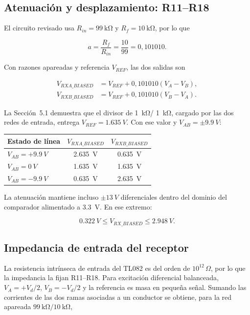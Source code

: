 \documentclass[11pt,a4paper]{article}
\begin{document}
\subsection{Atenuación y desplazamiento: R11--R18}

El circuito revisado usa $R_{in}=\SI{99}{\kilo\ohm}$ y
$R_f=\SI{10}{\kilo\ohm}$, por lo que

\[
 a=\frac{R_f}{R_{in}}=\frac{10}{99}=0{,}101010.
\]

Con razones apareadas y referencia $V_{REF}$, las dos salidas son

\begin{align*}
 V_{RXA\_BIASED} &= V_{REF}+0{,}101010(V_A-V_B),\\
 V_{RXB\_BIASED} &= V_{REF}+0{,}101010(V_B-V_A).
\end{align*}

La Sección~5.1 demuestra que el divisor de \SI{1}{\kilo\ohm}/
\SI{1}{\kilo\ohm}, cargado por las dos redes de entrada, entrega
$V_{REF}=\SI{1.635}{V}$. Con ese valor y $V_{AB}=\pm\SI{9.9}{V}$:

\begin{center}
\begin{tabular}{@{}lcc@{}}
\toprule
Estado de línea & $V_{RXA\_BIASED}$ & $V_{RXB\_BIASED}$ \\
\midrule
$V_{AB}=+\SI{9.9}{V}$ & \SI{2.635}{V} & \SI{0.635}{V} \\
$V_{AB}=\SI{0}{V}$ & \SI{1.635}{V} & \SI{1.635}{V} \\
$V_{AB}=-\SI{9.9}{V}$ & \SI{0.635}{V} & \SI{2.635}{V} \\
\bottomrule
\end{tabular}
\end{center}

La atenuación mantiene incluso $\pm\SI{13}{V}$ diferenciales dentro del
dominio del comparador alimentado a \SI{3.3}{V}. En ese extremo:

\[
 \SI{0.322}{V}\leq V_{RX\_BIASED}\leq\SI{2.948}{V}.
\]

\subsection{Impedancia de entrada del receptor}

La resistencia intrínseca de entrada del TL082 es del orden de
$10^{12}\,\Omega$, por lo que la impedancia la fijan R11--R18. Para excitación
diferencial balanceada, $V_A=+V_d/2$, $V_B=-V_d/2$ y la referencia es masa en
pequeña señal. Sumando las corrientes de las dos ramas asociadas a un conductor
se obtiene, para la red apareada $\SI{99}{\kilo\ohm}/\SI{10}{\kilo\ohm}$,
\end{document}
